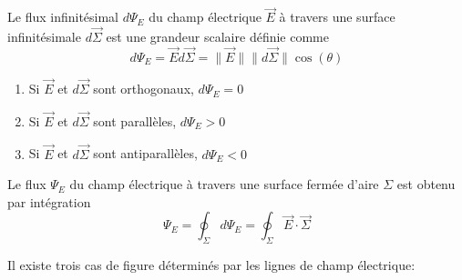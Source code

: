 \documentclass[
    11pt,
    a4paper,
    oneside,
    headinlcude, footinclude,
    twoside,
]{report}
\renewcommand{\vec}[1]{\overrightarrow{#1}}
\begin{document}
Le flux infinitésimal $d\Psi_E$ du champ électrique $\vec E$ à travers une
surface infinitésimale $d \vec \Sigma$ est une grandeur scalaire définie comme 
\begin{equation}
    \label{eq:7.18}
    d \Psi_E = \vec E d \vec \Sigma = \| \vec E\|\|d\vec \Sigma\| \cos(\theta)
\end{equation}

\begin{center}
    \begin{minipage}{.59\linewidth}
        \setlength{\parskip}{.3em}
        \begin{enumerate}
            \item Si $\vec E$ et $d\vec \Sigma$ sont orthogonaux, $d \Psi_E = 0$
            \item Si $\vec E$ et $d\vec \Sigma$ sont parallèles, $d \Psi_E > 0$
            \item Si $\vec E$ et $d\vec \Sigma$ sont antiparallèles, $d \Psi_E < 0$
        \end{enumerate}
    \end{minipage}
    \begin{minipage}{.4\linewidth}
    \end{minipage}
\end{center}

Le flux $\Psi_E$ du champ électrique à travers une surface fermée d'aire $\Sigma$
est obtenu par intégration 
\begin{equation}
    \label{eq:7.19}
    \Psi_E = \oint_{\Sigma} d \Psi_E = \oint_{\Sigma} \vec E \cdot \vec \Sigma
\end{equation}

Il existe trois cas de figure déterminés par les lignes de champ électrique:
\end{document}
